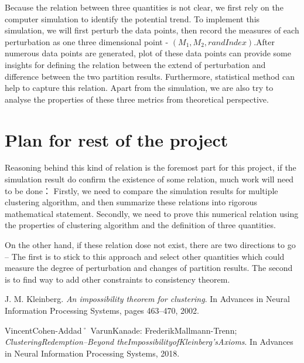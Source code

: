 \documentclass[a4paper,9pt]{article}
\begin{document}
Because the relation between three quantities is not clear, we first rely on the computer simulation to identify the potential trend. To implement this simulation,  we will first perturb the data points, then record the measures of each perturbation as one three dimensional point - $(M_1,M_2,rand Index)$.After numerous data points are generated, plot of these data points can provide some insights for defining the relation between the extend of perturbation and difference between the two partition results. Furthermore, statistical method can help to capture this relation. Apart from the simulation, we are also try to analyse the properties of these three metrics from theoretical perspective.
	\section*{Plan for rest of the project} 
Reasoning behind this kind of relation is the foremost part for this project, if the simulation result do confirm the existence of some relation, much work will need to be done： Firstly, we need to compare the simulation results for multiple clustering algorithm, and then summarize these relations into rigorous mathematical statement. Secondly, we need to prove this numerical relation using the properties of clustering algorithm and the definition of three quantities.

On the other hand, if these relation dose not exist, there are two directions to go – The first is to stick to this approach and select other quantities which could measure the degree of perturbation and changes of partition results. The second is to find way to add other constraints to consistency theorem.

	
	
	
	\begin{thebibliography}{99}
  J. M. Kleinberg.
 \emph{An impossibility theorem for clustering}.
 In Advances in Neural Information Processing Systems, pages 463–470, 2002. 
 
   VincentCohen-Addad˚ VarunKanade: FrederikMallmann-Trenn;
 \emph{ClusteringRedemption–Beyond theImpossibilityofKleinberg’sAxioms}.
 In Advances in Neural Information Processing Systems, 2018. 
 
	\end{thebibliography} 
\end{document}
